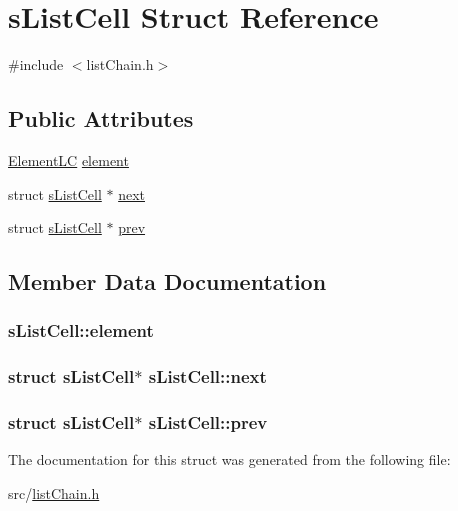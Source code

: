 \hypertarget{structs_list_cell}{\section{s\+List\+Cell Struct Reference}
\label{structs_list_cell}
}


{\ttfamily \#include $<$list\+Chain.\+h$>$}

\subsection*{Public Attributes}
\begin{DoxyCompactItemize}
\item 
\hyperlink{list_chain_8h_a18b1e58707b981d0b4689890f251192c}{Element\+L\+C} \hyperlink{structs_list_cell_a336ef72e79a3da6b88a34b91679499f0}{element}
\item 
struct \hyperlink{structs_list_cell}{s\+List\+Cell} $\ast$ \hyperlink{structs_list_cell_ae17f10366d036782c465e2dd9a63044f}{next}
\item 
struct \hyperlink{structs_list_cell}{s\+List\+Cell} $\ast$ \hyperlink{structs_list_cell_a3361e1e9c936f34a1848b8f41f354f8a}{prev}
\end{DoxyCompactItemize}


\subsection{Member Data Documentation}
\hypertarget{structs_list_cell_a336ef72e79a3da6b88a34b91679499f0}{
\subsubsection[{element}]{ s\+List\+Cell\+::element}}\label{structs_list_cell_a336ef72e79a3da6b88a34b91679499f0}
\hypertarget{structs_list_cell_ae17f10366d036782c465e2dd9a63044f}{
\subsubsection[{next}]{\setlength{\rightskip}{0pt plus 5cm}struct {\bf s\+List\+Cell}$\ast$ s\+List\+Cell\+::next}}\label{structs_list_cell_ae17f10366d036782c465e2dd9a63044f}
\hypertarget{structs_list_cell_a3361e1e9c936f34a1848b8f41f354f8a}{
\subsubsection[{prev}]{\setlength{\rightskip}{0pt plus 5cm}struct {\bf s\+List\+Cell}$\ast$ s\+List\+Cell\+::prev}}\label{structs_list_cell_a3361e1e9c936f34a1848b8f41f354f8a}


The documentation for this struct was generated from the following file\+:\begin{DoxyCompactItemize}
\item 
src/\hyperlink{list_chain_8h}{list\+Chain.\+h}\end{DoxyCompactItemize}

